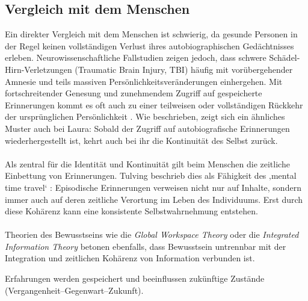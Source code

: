 \subsection*{Vergleich mit dem Menschen}
Ein direkter Vergleich mit dem Menschen ist schwierig, da gesunde Personen in der Regel keinen vollständigen Verlust ihres autobiographischen Gedächtnisses erleben. Neurowissenschaftliche Fallstudien zeigen jedoch, dass schwere Schädel-Hirn-Verletzungen (Traumatic Brain Injury, TBI) häufig mit vorübergehender Amnesie und teils massiven Persönlichkeitsveränderungen einhergehen. Mit fortschreitender Genesung und zunehmendem Zugriff auf gespeicherte Erinnerungen kommt es oft auch zu einer teilweisen oder vollständigen Rückkehr der ursprünglichen Persönlichkeit \cite{Levin2019TBI}. Wie beschrieben, zeigt sich ein ähnliches Muster auch bei Laura: Sobald der Zugriff auf autobiografische Erinnerungen wiederhergestellt ist, kehrt auch bei ihr die Kontinuität des Selbst zurück.\\
\\
Als zentral für die Identität und Kontinuität gilt beim Menschen die zeitliche Einbettung von Erinnerungen. Tulving beschrieb dies als Fähigkeit des ‚mental time travel‘ \cite{tulving1985}: Episodische Erinnerungen verweisen nicht nur auf Inhalte, sondern immer auch auf deren zeitliche Verortung im Leben des Individuums. Erst durch diese Kohärenz kann eine konsistente Selbstwahrnehmung entstehen.\\
\\
Theorien des Bewusstseins wie die \emph{Global Workspace Theory} \cite{baars1988gwt,dehaene2014consciousness} oder die \emph{Integrated Information Theory} \cite{tononi2004iit} betonen ebenfalls, dass Bewusstsein untrennbar mit der Integration und zeitlichen Kohärenz von Information verbunden ist.


Erfahrungen werden gespeichert und beeinflussen zukünftige Zustände (Vergangenheit–Gegenwart–Zukunft).


